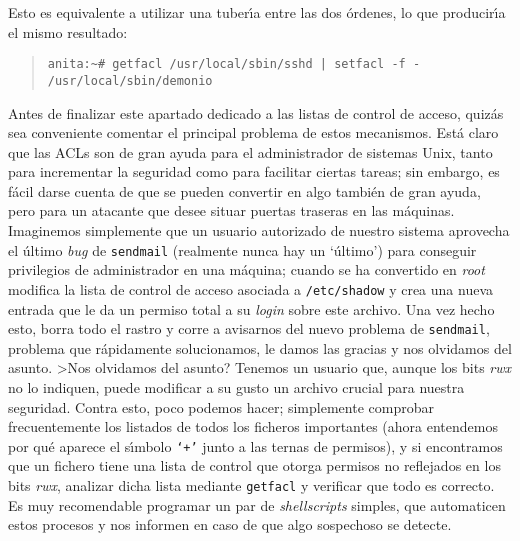 Esto es equivalente a utilizar una tuber\'{\i}a entre las dos \'ordenes, lo
que producir\'{\i}a el mismo resultado:
\begin{quote}
\begin{verbatim}
anita:~# getfacl /usr/local/sbin/sshd | setfacl -f - /usr/local/sbin/demonio
\end{verbatim}
\end{quote}
Antes de finalizar este apartado dedicado a las listas de control de acceso,
quiz\'as sea conveniente comentar el principal problema de estos mecanismos. 
Est\'a claro que las ACLs son de gran ayuda para el administrador de sistemas
Unix, tanto para incrementar la seguridad como para facilitar ciertas tareas;
sin embargo, es f\'acil darse cuenta de que se pueden convertir en algo 
tambi\'en de gran ayuda, pero para un atacante que desee situar puertas
traseras en las m\'aquinas. Imaginemos simplemente que un usuario 
autorizado de nuestro sistema aprovecha el \'ultimo {\it bug} de {\tt sendmail}
(realmente nunca hay un `\'ultimo') para conseguir privilegios de administrador 
en una m\'aquina; cuando se ha convertido en {\it root} modifica la lista de
control de acceso asociada a {\tt /etc/shadow} y crea una nueva entrada que
le da un permiso total a su {\it login} sobre este archivo. Una vez hecho esto,
borra todo el rastro y 
corre a avisarnos del nuevo problema de {\tt sendmail}, problema que 
r\'apidamente solucionamos, le damos las gracias y nos olvidamos del asunto.
>Nos olvidamos del asunto? Tenemos un usuario que, aunque los bits {\it rwx}
no lo indiquen, puede modificar a su gusto un archivo crucial para nuestra 
seguridad. Contra esto, poco podemos hacer; simplemente comprobar frecuentemente
los listados de todos los ficheros importantes (ahora entendemos por qu\'e 
aparece el s\'{\i}mbolo {\tt `+'} junto a las ternas de permisos), y si 
encontramos que un 
fichero tiene una lista de control que otorga permisos no reflejados en los
bits {\it rwx}, analizar dicha lista mediante {\tt getfacl} y verificar que
todo es correcto. Es muy recomendable programar un par de {\it shellscripts}
simples, que automaticen estos procesos y nos informen en caso de que algo 
sospechoso se detecte.
